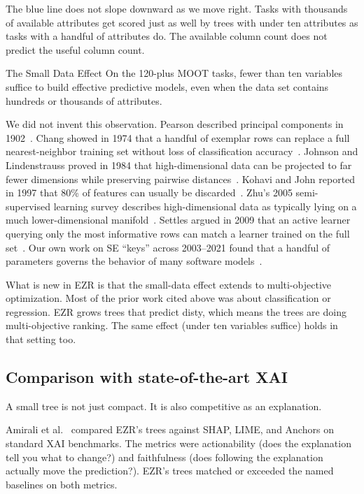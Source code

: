 \documentclass[AMA,STIX2COL]{WileyNJDv5}
\newcommand{\IT}{{\sffamily EZR}}
\begin{document}
The blue line does not slope downward as we move right. Tasks
with thousands of available attributes get scored just as well
by trees with under ten attributes as tasks with a handful of
attributes do. The available column count does not predict the
useful column count.

\begin{hence}{The Small Data Effect}
On the 120-plus MOOT tasks, fewer than ten variables suffice to
build effective predictive models, even when the data set
contains hundreds or thousands of attributes.
\end{hence}

We did not invent this observation. Pearson described principal
components in 1902~\cite{pca}. Chang showed in 1974 that a
handful of exemplar rows can replace a full nearest-neighbor
training set without loss of classification
accuracy~\cite{chang74}. Johnson and Lindenstrauss proved in
1984 that high-dimensional data can be projected to far fewer
dimensions while preserving pairwise
distances~\cite{johnson1984extensions}. Kohavi and John reported
in 1997 that 80\% of features can usually be
discarded~\cite{kohavi97}. Zhu's 2005 semi-supervised learning
survey describes high-dimensional data as typically lying on a
much lower-dimensional manifold~\cite{zhu2005semi}. Settles
argued in 2009 that an active learner querying only the most
informative rows can match a learner trained on the full
set~\cite{settles2009active}. Our own work on SE ``keys'' across
2003--2021 found that a handful of parameters governs the
behavior of many software
models~\cite{me03a,me07a,me21a,menzies2008implications}.

What is new in \IT{} is that the small-data effect extends to
multi-objective optimization. Most of the prior work cited above
was about classification or regression. \IT{} grows trees that
predict \textsf{disty}, which means the trees are doing
multi-objective ranking. The same effect (under ten variables
suffice) holds in that setting too.

\subsection{Comparison with state-of-the-art XAI}

A small tree is not just compact. It is also competitive as an
explanation.

Amirali et al.~\cite{amirali} compared \IT{}'s trees against
SHAP, LIME, and Anchors on standard XAI benchmarks. The metrics
were actionability (does the explanation tell you what to
change?) and faithfulness (does following the explanation
actually move the prediction?). \IT{}'s trees matched or
exceeded the named baselines on both metrics.
\end{document}
